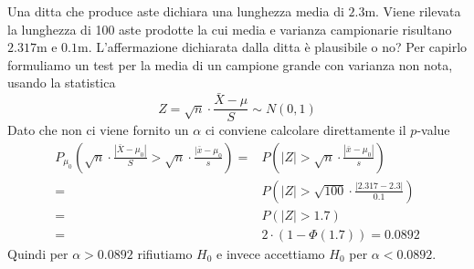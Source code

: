 \begin{example}
	Una ditta che produce aste dichiara una lunghezza media di $2.3$m. Viene rilevata la lunghezza
	di 100 aste prodotte la cui media e varianza campionarie risultano $2.317$m e $0.1$m.
	L'affermazione dichiarata dalla ditta è plausibile o no? Per capirlo formuliamo un test per
	la media di un campione grande con varianza non nota, usando la statistica
	\[ Z = \sqrt{n} \cdot \frac{\bar{X} - \mu}{S} \sim N(0, 1) \]
	Dato che non ci viene fornito un $\alpha$ ci conviene calcolare direttamente il $p$-value
	\begin{align*}
		P_{\mu_0} \left( \sqrt{n} \cdot \frac{|\bar{X} - \mu_0|}{S} >
		\sqrt{n} \cdot \frac{|\bar{x} - \mu_0}{s} \right) = &
		P \left( |Z| > \sqrt{n} \cdot \frac{|\bar{x} - \mu_0|}{s} \right)                        \\
		=                                                   &
		P \left( |Z| > \sqrt{100} \cdot \frac{|2.317 - 2.3|}{0.1} \right)                        \\
		=                                                   & P \left( |Z| > 1.7 \right)         \\
		=                                                   & 2 \cdot (1 - \Phi (1.7) ) = 0.0892
	\end{align*}
	Quindi per $\alpha > 0.0892$ rifiutiamo $H_0$ e invece accettiamo $H_0$ per $\alpha < 0.0892$.
\end{example}